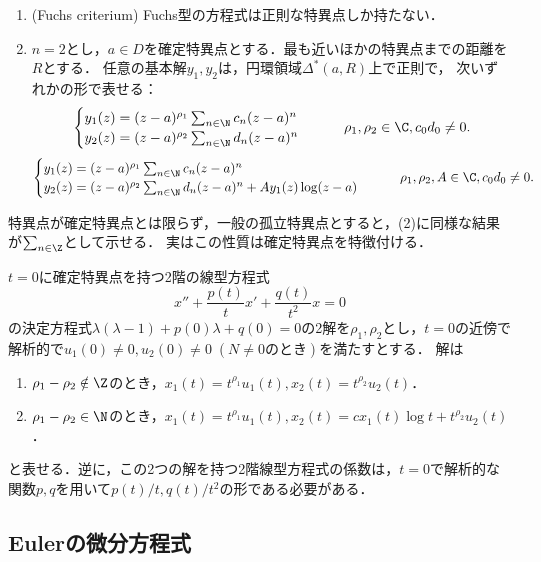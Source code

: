 \documentclass[uplatex,dvipdfmx]{jsreport}
\begin{document}
\begin{theorem}[Fuchs]\mbox{}
    \begin{enumerate}
        \item (Fuchs criterium) Fuchs型の方程式は正則な特異点しか持たない．
        \item $n=2$とし，$a\in D$を確定特異点とする．最も近いほかの特異点までの距離を$R$とする．
        任意の基本解$y_1,y_2$は，円環領域$\Delta^*(a,R)$上で正則で，
        次いずれかの形で表せる：
        \[\begin{cases}
            y_1(z)=(z-a)^{\rho_1}\sum_{n\in\N}c_n(z-a)^n\\
            y_2(z)=(z-a)^{\rho_2}\sum_{n\in\N}d_n(z-a)^n
        \end{cases}\qquad\rho_1,\rho_2\in\C,c_0d_0\ne0.\]
        \[\begin{cases}
            y_1(z)=(z-a)^{\rho_1}\sum_{n\in\N}c_n(z-a)^n\\
            y_2(z)=(z-a)^{\rho_2}\sum_{n\in\N}d_n(z-a)^n+Ay_1(z)\log(z-a)
        \end{cases}\qquad\rho_1,\rho_2,A\in\C,c_0d_0\ne0.\]
    \end{enumerate}
\end{theorem}
\begin{remarks}
    特異点が確定特異点とは限らず，一般の孤立特異点とすると，(2)に同様な結果が$\sum_{n\in\Z}$として示せる．
    実はこの性質は確定特異点を特徴付ける．
\end{remarks}

\begin{corollary}[より簡単な表現]
    $t=0$に確定特異点を持つ2階の線型方程式
    \[x''+\frac{p(t)}{t}x'+\frac{q(t)}{t^2}x=0\]
    の決定方程式$\lambda(\lambda-1)+p(0)\lambda+q(0)=0$の2解を$\rho_1,\rho_2$とし，$t=0$の近傍で解析的で$u_1(0)\ne0,u_2(0)\ne0\;(N\ne0\text{のとき})$を満たすとする．
    解は
    \begin{enumerate}
        \item $\rho_1-\rho_2\notin\Z$のとき，$x_1(t)=t^{\rho_1}u_1(t),x_2(t)=t^{\rho_2}u_2(t)$．
        \item $\rho_1-\rho_2\in\N$のとき，$x_1(t)=t^{\rho_1}u_1(t),x_2(t)=cx_1(t)\log t+t^{\rho_2}u_2(t)$．
    \end{enumerate}
    と表せる．逆に，この2つの解を持つ2階線型方程式の係数は，$t=0$で解析的な関数$p,q$を用いて$p(t)/t,q(t)/t^2$の形である必要がある．
\end{corollary}

\subsection{Eulerの微分方程式}
\end{document}

